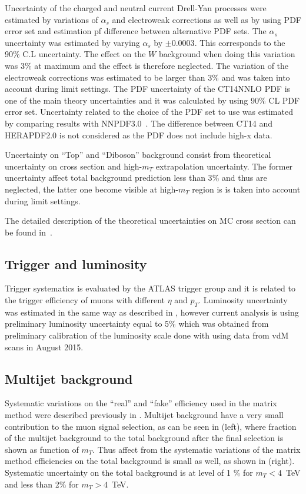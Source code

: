 Uncertainty of the charged and neutral current Drell-Yan processes were estimated by variations of $\alpha_s$ and electroweak corrections as well as by using PDF error set and estimation pf difference between alternative PDF sets.
The $\alpha_s$ uncertainty was estimated by varying $\alpha_s$ by $\pm 0.0003$. This corresponds to the 90\% C.L uncertainty. The effect on the $W$ background when doing this variation
was $3\%$ at maximum and the effect is therefore neglected. 
The variation of the electroweak corrections was estimated to be larger than $3\%$ and was
taken into account during limit settings.
The PDF uncertainty of the CT14NNLO PDF is one of the main theory uncertainties
and it was calculated by using 90$\%$ CL PDF error set.
Uncertainty related to the choice of the PDF set to use was estimated by comparing
results with NNPDF3.0~\cite{Ball:2014uwa}.
The difference between CT14 and HERAPDF2.0 is not considered as the PDF does not include high-x data. 

Uncertainty on ``Top'' and ``Diboson'' background consist from theoretical uncertainty on cross section and high-$m_T$ extrapolation uncertainty. The former uncertainty affect total background
prediction less than 3$\%$ and thus are neglected, the latter one become visible at high-$m_T$
region is is taken into account during limit settings.

The detailed description of the theoretical uncertainties on MC cross section can be found in~\cite{Aaboud:2016zkn}.

\subsection{Trigger and luminosity}
Trigger systematics is evaluated by the ATLAS trigger group and it is related to the trigger
efficiency of muons with different $\eta$ and $p_T$.
Luminosity uncertainty was estimated in the same way as described in , however current analysis is using preliminary luminosity
uncertainty equal to 5$\%$ which was obtained from preliminary calibration of the luminosity scale done with using data from vdM scans in August 2015.

\subsection{Multijet background}
\label{subsec:multijet_systematcs}

Systematic variations on the ``real'' and ``fake'' efficiency used in the matrix method were
described previously in .
Multijet background have a very small contribution to the muon signal selection, as can be seen in 
 (left), where fraction of the multijet background to the total background
after the final selection is shown as function of $m_T$. Thus affect from the systematic
variations of the matrix method efficiencies on the total background is small as well, as shown in
 (right). 
Systematic uncertainty on the total background is at level of 1 $\%$ for $m_T<4$~TeV and less than 2$\%$ for $m_T>4$~TeV.

